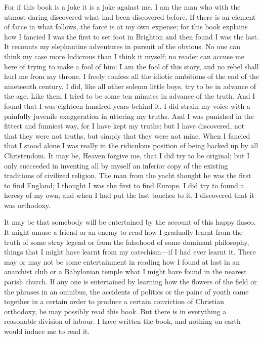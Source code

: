 For if this book is a joke it is a joke against me. I am the man who with the utmost daring discovered what had been discovered before. If there is an element of farce in what follows, the farce is at my own expense; for this book explains how I fancied I was the first to set foot in Brighton and then found I was the last. It recounts my elephantine adventures in pursuit of the obvious. No one can think my case more ludicrous than I think it myself; no reader can accuse me here of trying to make a fool of him: I am the fool of this story, and no rebel shall hurl me from my throne. I freely confess all the idiotic ambitions of the end of the nineteenth century. I did, like all other solemn little boys, try to be in advance of the age. Like them I tried to be some ten minutes in advance of the truth. And I found that I was eighteen hundred years behind it. I did strain my voice with a painfully juvenile exaggeration in uttering my truths. And I was punished in the fittest and funniest way, for I have kept my truths: but I have discovered, not that they were not truths, but simply that they were not mine. When I fancied that I stood alone I was really in the ridiculous position of being backed up by all Christendom. It may be, Heaven forgive me, that I did try to be original; but I only succeeded in inventing all by myself an inferior copy of the existing traditions of civilized religion. The man from the yacht thought he was the first to find England; I thought I was the first to find Europe. I did try to found a heresy of my own; and when I had put the last touches to it, I discovered that it was orthodoxy.

It may be that somebody will be entertained by the account of this happy fiasco. It might amuse a friend or an enemy to read how I gradually learnt from the truth of some stray legend or from the falsehood of some dominant philosophy, things that I might have learnt from my catechism—if I had ever learnt it. There may or may not be some entertainment in reading how I found at last in an anarchist club or a Babylonian temple what I might have found in the nearest parish church. If any one is entertained by learning how the flowers of the field or the phrases in an omnibus, the accidents of politics or the pains of youth came together in a certain order to produce a certain conviction of Christian orthodoxy, he may possibly read this book. But there is in everything a reasonable division of labour. I have written the book, and nothing on earth would induce me to read it.

